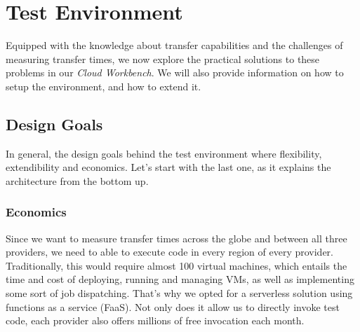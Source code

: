 \documentclass[a4paper,bibliography=totoc]{scrartcl}
\begin{document}
\section{Test Environment}\label{sec:testenv}
Equipped with the knowledge about transfer capabilities and the challenges of measuring transfer times, we now explore the practical solutions to these problems in our \textit{Cloud Workbench}.\cite{wb} We will also provide information on how to setup the environment, and how to extend it.

\subsection{Design Goals}
In general, the design goals behind the test environment where flexibility, extendibility and economics. Let's start with the last one, as it explains the architecture from the bottom up.

\subsubsection{Economics}
Since we want to measure transfer times across the globe and between all three providers, we need to able to execute code in every region of every provider. Traditionally, this would require almost 100 virtual machines,\cite{aws_regions,azure_regions,gcp_regions} which entails the time and cost of deploying, running and managing VMs, as well as implementing some sort of job dispatching. That's why we opted for a serverless solution using functions as a service (FaaS).\cite{faas_introduction} Not only does it allow us to directly invoke test code, each provider also offers millions of free invocation each month.\cite{aws_lambda,azure_functions,gcp_functions}
\end{document}
